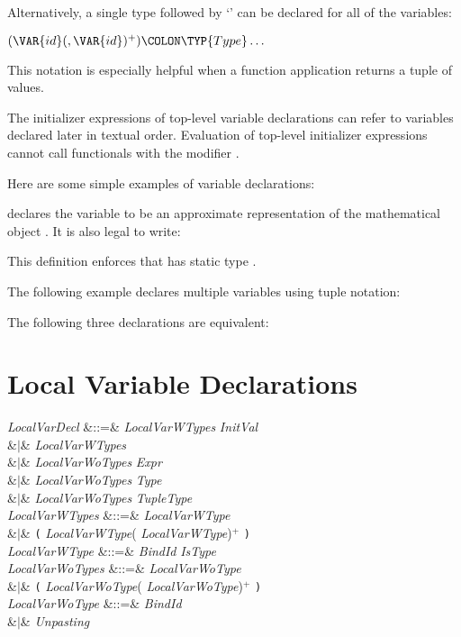 Alternatively, a single type followed by `\EXP{\ldots}'
can be declared for all of the variables:
\begin{Fortress}
\((\VAR{id}(, \VAR{id})^+)\COLON \TYP{Type}\ldots\)
\end{Fortress}
This notation is especially helpful when a function application returns a tuple of values.

The initializer expressions of top-level variable declarations can refer to
variables declared later in textual order.
\label{decl-io}
Evaluation of top-level initializer expressions cannot call
functionals with the modifier .


Here are some simple examples of variable declarations:

declares the variable \EXP{\pi}
to be an approximate representation of the mathematical object \EXP{\pi}.
It is also legal to write:

This definition enforces that \EXP{\pi} has static type .

The following example declares multiple variables using tuple notation:


The following three declarations are equivalent:

\vspace*{-1em}

\vspace*{-1.4em}



\section{Local Variable Declarations}
\begin{Grammar}
\emph{LocalVarDecl}
&::=&  \emph{LocalVarWTypes} \emph{InitVal} \\
&$|$&  \emph{LocalVarWTypes}\\
&$|$& \emph{LocalVarWoTypes} \EXP{=} \emph{Expr} \\
&$|$&  \emph{LocalVarWoTypes} \EXP{\mathrel{\mathtt{:}}} \emph{Type}
 \\
&$|$&  \emph{LocalVarWoTypes} \EXP{\mathrel{\mathtt{:}}} \emph{TupleType}
 \\

\emph{LocalVarWTypes} &::=& \emph{LocalVarWType} \\
&$|$& \texttt{(} \emph{LocalVarWType}(\EXP{,} \emph{LocalVarWType})$^+$ \texttt{)}\\
\emph{LocalVarWType} &::=& \emph{BindId} \emph{IsType}\\

\emph{LocalVarWoTypes} &::=& \emph{LocalVarWoType} \\
&$|$& \texttt{(} \emph{LocalVarWoType}(\EXP{,} \emph{LocalVarWoType})$^+$ \texttt{)}\\
\emph{LocalVarWoType} &::=& \emph{BindId}\\
&$|$& \emph{Unpasting} \\

\end{Grammar}


